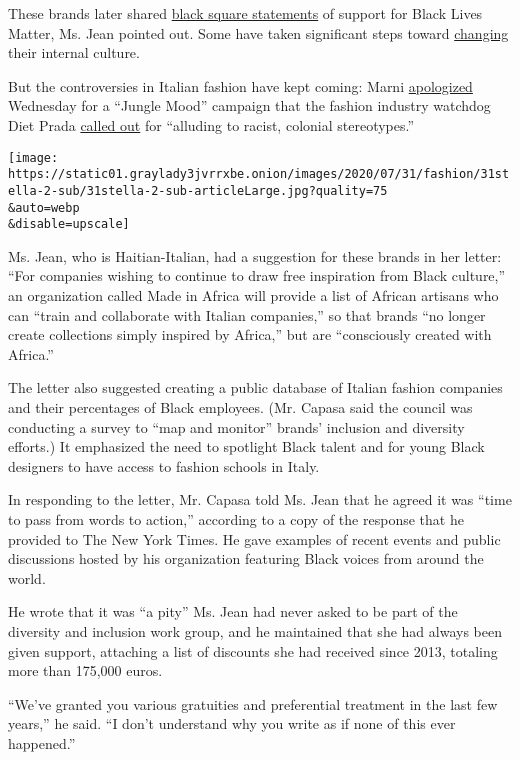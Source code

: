 These brands later shared
\href{https://www.nytimes3xbfgragh.onion/2020/06/06/style/fashion-racism-actions.html}{black
square statements} of support for Black Lives Matter, Ms. Jean pointed
out. Some have taken significant steps toward
\href{https://www.vogue.com/article/gucci-diversity-inclusion-renee-tirado}{changing}
their internal culture.

But the controversies in Italian fashion have kept coming: Marni
\href{https://www.instagram.com/p/CDPtl8EHYAr/}{apologized} Wednesday
for a ``Jungle Mood'' campaign that the fashion industry watchdog Diet
Prada \href{https://www.instagram.com/p/CDMR7AjnYUx/?hl=en}{called out}
for ``alluding to racist, colonial stereotypes.''

\texttt{[image: https://static01.graylady3jvrrxbe.onion/images/2020/07/31/fashion/31stella-2-sub/31stella-2-sub-articleLarge.jpg?quality=75\\\&auto=webp\\\&disable=upscale]}

Ms. Jean, who is Haitian-Italian, had a suggestion for these brands in
her letter: ``For companies wishing to continue to draw free inspiration
from Black culture,'' an organization called Made in Africa will provide
a list of African artisans who can ``train and collaborate with Italian
companies,'' so that brands ``no longer create collections simply
inspired by Africa,'' but are ``consciously created with Africa.''

The letter also suggested creating a public database of Italian fashion
companies and their percentages of Black employees. (Mr. Capasa said the
council was conducting a survey to ``map and monitor'' brands' inclusion
and diversity efforts.) It emphasized the need to spotlight Black talent
and for young Black designers to have access to fashion schools in
Italy.

In responding to the letter, Mr. Capasa told Ms. Jean that he agreed it
was ``time to pass from words to action,'' according to a copy of the
response that he provided to The New York Times. He gave examples of
recent events and public discussions hosted by his organization
featuring Black voices from around the world.

He wrote that it was ``a pity'' Ms. Jean had never asked to be part of
the diversity and inclusion work group, and he maintained that she had
always been given support, attaching a list of discounts she had
received since 2013, totaling more than 175,000 euros.

``We've granted you various gratuities and preferential treatment in the
last few years,'' he said. ``I don't understand why you write as if none
of this ever happened.''


